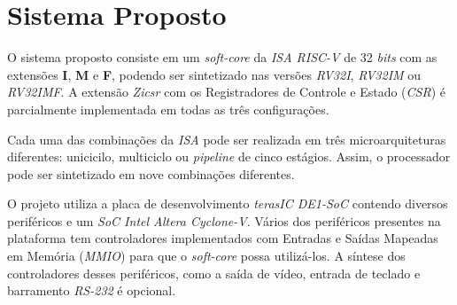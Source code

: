 \chapter{Sistema Proposto}\label{cap_proposta}

{ O sistema proposto consiste em um \textit{soft-core} da \textit{ISA RISC-V}
    de 32 \textit{bits} com as extensões \textbf{I}, \textbf{M} e \textbf{F},
    podendo ser sintetizado nas versões \textit{RV32I}, \textit{RV32IM} ou
    \textit{RV32IMF}. A extensão \textit{Zicsr} com os Registradores de Controle
    e Estado (\textit{CSR}) é parcialmente implementada em todas as três
    configurações.
}

{ Cada uma das combinações da \textit{ISA} pode ser realizada em três
    microarquiteturas diferentes: unicicilo, multiciclo ou \textit{pipeline} de
    cinco estágios. Assim, o processador pode ser sintetizado em nove
    combinações diferentes.
}

{ O projeto utiliza a placa de desenvolvimento \textit{terasIC DE1-SoC} contendo
    diversos periféricos e um \textit{SoC Intel Altera Cyclone-V}. Vários dos
    periféricos presentes na plataforma tem controladores implementados com
    Entradas e Saídas Mapeadas em Memória (\textit{MMIO}) para que o
    \textit{soft-core} possa utilizá-los. A síntese dos controladores desses
    periféricos, como a saída de vídeo, entrada de teclado e barramento
    \textit{RS-232} é opcional.
}


